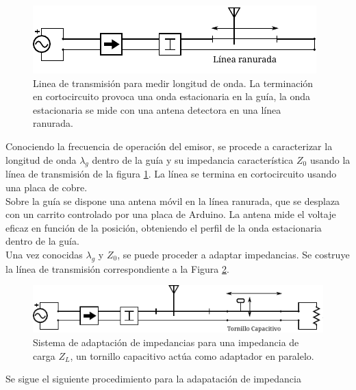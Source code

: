 \documentclass[11pt,a4paper]{article}
\begin{document}
\begin{multicols}{2}
\begin{figure}[H]
    \centering
    \includegraphics[width=0.9\linewidth]{Images/arreglo2.pdf}
    \caption{Linea de transmisión para medir longitud de onda. La terminación en cortocircuito provoca una onda estacionaria en la guía, la onda estacionaria se mide con una antena detectora en una línea ranurada.}
    \label{fig:arr2}
\end{figure}

Conociendo la frecuencia de operación del emisor, se procede a caracterizar la longitud de onda $\lambda_g$ dentro de la guía y su impedancia característica $Z_0$ usando la línea de transmisión de la figura \ref{fig:arr2}. La línea se termina en cortocircuito usando una placa de cobre.\\


Sobre la guía se dispone una antena móvil en la línea ranurada, que se desplaza con un carrito controlado por una placa de Arduino. 
La antena mide el voltaje eficaz en función de la posición, obteniendo el perfil de la onda estacionaria dentro de la guía.\\ 

Una vez conocidas $\lambda_g$ y $Z_0$, se puede proceder a adaptar impedancias. Se costruye la línea de transmisión correspondiente a la Figura \ref{fig:arr4}.

\begin{figure}[H]
    \centering
    \includegraphics[width=\linewidth]{Images/arreglo4.pdf}
    \caption{Sistema de adaptación de impedancias para una impedancia de carga $Z_L$, un tornillo capacitivo actúa como adaptador en paralelo.}
    \label{fig:arr4}
\end{figure}

Se sigue el siguiente procedimiento para la adapatación de impedancia


\end{multicols}
\end{document}
